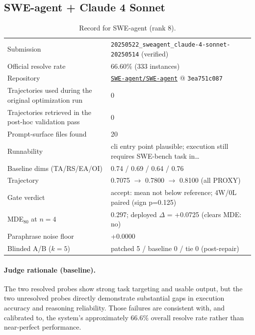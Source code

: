 \subsection{SWE-agent + Claude 4 Sonnet}
\label{app:agent8}
\begin{table}[h]\centering\scriptsize
\caption{Record for SWE-agent (rank 8).}
\begin{tabular}{lp{8.2cm}}\toprule
Submission & \texttt{20250522\_\allowbreak{}sweagent\_\allowbreak{}claude-4-sonnet-20250514} (verified) \\
Official resolve rate & 66.60\% (333 instances) \\
Repository & \href{https://github.com/SWE-agent/SWE-agent}{\texttt{SWE-agent/SWE-agent}} @ \texttt{3ea751c087} \\
Trajectories used during the original optimization run & 0 \\
Trajectories retrieved in the post-hoc validation pass & 0 \\
Prompt-surface files found & 20 \\
Runnability & cli entry point plausible; execution still requires SWE-bench task in\ldots{} \\
Baseline dims (TA/RS/EA/OI) & 0.74 / 0.69 / 0.64 / 0.76 \\
Trajectory & 0.7075 $\to$ 0.7800 $\to$ 0.8100 (all PROXY) \\
Gate verdict & accept: mean not below reference; 4W/0L paired (sign p=0.125) \\
MDE$_{80}$ at $n{=}4$ & 0.297; deployed $\Delta$ = +0.0725 (clears MDE: no) \\
Paraphrase noise floor & +0.0000 \\
Blinded A/B ($k{=}5$) & patched 5 / baseline 0 / tie 0 (post-repair) \\
\bottomrule\end{tabular}\end{table}
\paragraph{Judge rationale (baseline).}
The two resolved probes show strong task targeting and usable output, but the two unresolved probes directly demonstrate substantial gaps in execution accuracy and reasoning reliability. Those failures are consistent with, and calibrated to, the system's approximately 66.6\% overall resolve rate rather than near-perfect performance.
